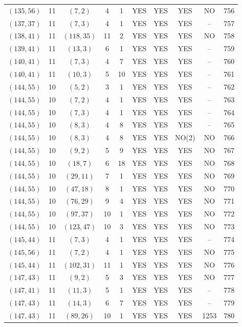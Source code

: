 \begin{longtable}{|c|c|c|c|c|c|c|c|c|c|}
$(135, 56)$ & 11 & $(7, 2)$ & 4 & 1 & YES & YES & YES & NO & 756\\
$(137, 37)$ & 11 & $(7, 3)$ & 4 & 1 & YES & YES & YES & -- & 757\\
$(138, 41)$ & 11 & $(118, 35)$ & 11 & 2 & YES & YES & YES & NO & 758\\
$(139, 41)$ & 11 & $(13, 3)$ & 6 & 1 & YES & YES & YES & -- & 759\\
$(140, 41)$ & 11 & $(7, 3)$ & 4 & 7 & YES & YES & YES & -- & 760\\
$(140, 41)$ & 11 & $(10, 3)$ & 5 & 10 & YES & YES & YES & -- & 761\\
$(144, 55)$ & 10 & $(5, 2)$ & 3 & 1 & YES & YES & YES & -- & 762\\
$(144, 55)$ & 10 & $(7, 2)$ & 4 & 1 & YES & YES & YES & -- & 763\\
$(144, 55)$ & 10 & $(7, 3)$ & 4 & 1 & YES & YES & YES & -- & 764\\
$(144, 55)$ & 10 & $(8, 3)$ & 4 & 8 & YES & YES & YES & -- & 765\\
$(144, 55)$ & 10 & $(8, 3)$ & 4 & 8 & YES & YES & NO(2) & NO & 766\\
$(144, 55)$ & 10 & $(9, 2)$ & 5 & 9 & YES & YES & YES & NO & 767\\
$(144, 55)$ & 10 & $(18, 7)$ & 6 & 18 & YES & YES & YES & NO & 768\\
$(144, 55)$ & 10 & $(29, 11)$ & 7 & 1 & YES & YES & YES & NO & 769\\
$(144, 55)$ & 10 & $(47, 18)$ & 8 & 1 & YES & YES & YES & NO & 770\\
$(144, 55)$ & 10 & $(76, 29)$ & 9 & 4 & YES & YES & YES & NO & 771\\
$(144, 55)$ & 10 & $(97, 37)$ & 10 & 1 & YES & YES & YES & NO & 772\\
$(144, 55)$ & 10 & $(123, 47)$ & 10 & 3 & YES & YES & YES & NO & 773\\
$(145, 44)$ & 11 & $(7, 3)$ & 4 & 1 & YES & YES & YES & -- & 774\\
$(145, 56)$ & 11 & $(7, 2)$ & 4 & 1 & YES & YES & YES & NO & 775\\
$(145, 44)$ & 11 & $(102, 31)$ & 11 & 1 & YES & YES & YES & NO & 776\\
$(147, 43)$ & 11 & $(9, 2)$ & 5 & 3 & YES & YES & YES & NO & 777\\
$(147, 41)$ & 11 & $(11, 3)$ & 5 & 1 & YES & YES & YES & -- & 778\\
$(147, 43)$ & 11 & $(14, 3)$ & 6 & 7 & YES & YES & YES & -- & 779\\
$(147, 43)$ & 11 & $(89, 26)$ & 10 & 1 & YES & YES & YES & 1253 & 780\\

\end{longtable}
